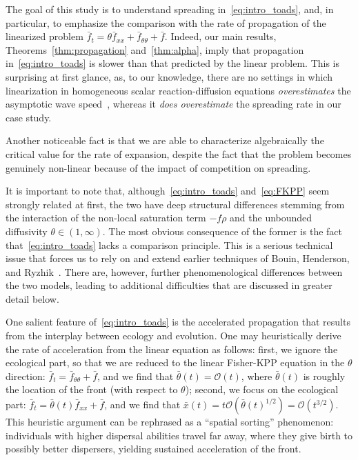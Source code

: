 \documentclass[AHL,Unicode,longabstracts]{cedram}
\newcommand{\mO}{\mathcal{O}}
\newcommand{\1}{\mathds{1}}
\begin{document}
The goal of this study is to understand spreading in~\eqref{eq:intro_toads}, and, in particular, to emphasize the comparison with the rate of propagation of the linearized problem $\bar f_t = \theta \bar f_{xx} + \bar f_{\theta\theta} + \bar f$. Indeed, our main results, Theorems~\ref{thm:propagation} and~\ref{thm:alpha}, imply that propagation in~\eqref{eq:intro_toads} is slower than that predicted by the linear problem. This is surprising at first glance, as, to our knowledge, there are no settings in which linearization in homogeneous scalar reaction-diffusion equations \emph{overestimates} the asymptotic wave speed~\cite{crooks_travelling_2003,hadeler_travelling_1975,lucia_linear_2004}, whereas it \emph{does overestimate} the spreading rate in our case study.

Another noticeable fact is that we are able to characterize algebraically the critical value for the rate of expansion, despite the fact that the problem becomes genuinely non-linear because of the impact of competition on spreading.



It is important to note that, although~\eqref{eq:intro_toads} and~\eqref{eq:FKPP} seem strongly related at first, the two have deep structural differences stemming from the interaction of the non-local saturation term $-f\rho$ and the unbounded diffusivity $\theta \in (1,\infty)$. The most obvious consequence of the former is the fact that~\eqref{eq:intro_toads} lacks a comparison principle. This is a serious technical issue that forces us to rely on and extend earlier techniques of Bouin, Henderson, and Ryzhik~\cite{BHR_acceleration}. There are, however, further phenomenological differences between the two models, leading to additional difficulties that are discussed in greater detail below.

One salient feature of~\eqref{eq:intro_toads} is the accelerated propagation that results from the interplay between ecology and evolution. One may heuristically derive the rate of acceleration from the linear equation as follows: first, we ignore the ecological part, so that we are reduced to the linear Fisher-KPP equation in the $\theta$ direction: $\bar f_t = \bar f_{\theta\theta} + \bar f$, and we find that $\bar \theta(t) = \mO(t)$, where $\bar \theta(t)$ is roughly the location of the front (with respect to $\theta$); second, we focus on the ecological part: $\bar f_t = \bar \theta(t) \bar f_{xx} + \bar f$, and we find that $\bar x(t) = t \mO(\bar \theta(t)^{1/2}) = \mO(t^{3/2}) $. This heuristic argument can be rephrased as a ``spatial sorting'' phenomenon: individuals with higher dispersal abilities travel far away, where they give birth to possibly better dispersers, yielding sustained acceleration of the front.
\end{document}
